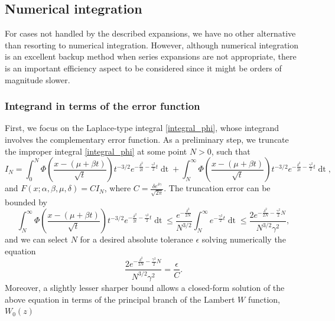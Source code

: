 \documentclass[10pt,a4paper,oneside]{article}
\numberwithin{equation}{section}
\begin{document}
\subsection{Numerical integration}\label{section_numerical_integration}

For cases not handled by the described expansions, we have no other alternative than resorting to numerical integration. However, although numerical integration is an excellent backup method when series expansions are not appropriate, there is an important efficiency aspect to be considered since it might be orders of magnitude slower. 

\subsubsection{Integrand in terms of the error function}
First, we focus on the Laplace-type integral \eqref{integral_phi}, whose integrand involves the complementary error function.
As a preliminary step, we truncate the improper integral \eqref{integral_phi} at some point $N > 0$, such that
\begin{equation}\label{truncated_integral}
I_N = \int_0^N \Phi\left(\frac{x - (\mu +\beta t)}{\sqrt{t}}\right) t^{-3/2} e^{-\frac{\delta^2}{2t} - \frac{\gamma^2}{2}t} \mathop{dt} + \int_N^{\infty} \Phi\left(\frac{x - (\mu +\beta t)}{\sqrt{t}}\right) t^{-3/2} e^{-\frac{\delta^2}{2t} - \frac{\gamma^2}{2}t} \mathop{dt},
\end{equation}
and $F(x; \alpha, \beta, \mu, \delta) = C I_N$, where $C = \frac{\delta e^{\delta \gamma}}{\sqrt{2\pi}}$. The truncation error can be bounded by
\begin{equation}
\int_N^{\infty} \Phi\left(\frac{x - (\mu +\beta t)}{\sqrt{t}}\right) t^{-3/2} e^{-\frac{\delta^2}{2t} - \frac{\gamma^2}{2}t} \mathop{dt} \le \frac{e^{-\frac{\delta^2}{2N}}}{N^{3/2}}\int_N^{\infty} e^{- \frac{\gamma^2}{2}t} \mathop{dt} \le \frac{2 e^{-\frac{\delta^2}{2N} - \frac{\gamma^2}{2}N}}{N^{3/2} \gamma^2},
\end{equation}
and we can select $N$ for a desired absolute tolerance $\epsilon$ solving numerically the equation
\begin{equation}
\frac{2 e^{-\frac{\delta^2}{2N} - \frac{\gamma^2}{2}N}}{N^{3/2} \gamma^2} = \frac{\epsilon}{C}.
\end{equation}
Moreover, a slightly lesser sharper bound allows a closed-form solution of the above equation in terms of the principal branch of the Lambert $W$ function, $W_0(z)$
\end{document}
